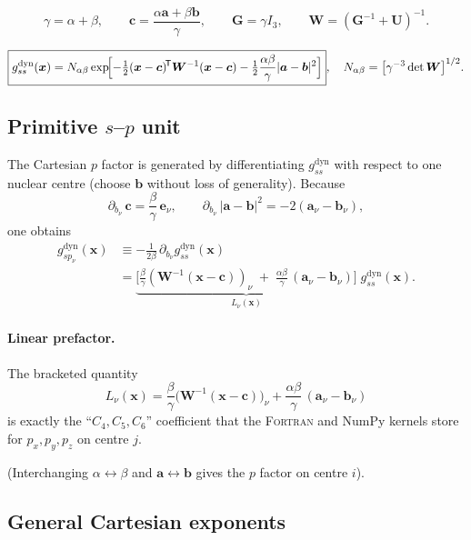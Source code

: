 \documentclass{article}
\newcommand*\expa{\alpha}
\newcommand*\expb{\beta}
\newcommand*\expab{\gamma}           %
\newcommand*\prefac{N_{\expa\expb}}  %
\newcommand*\veca{\bm a}
\newcommand*\vecb{\bm b}
\newcommand*\vecc{\bm c}
\newcommand*\matG{\bm G}             %
\newcommand*\matU{\bm U}             %
\newcommand*\matW{\bm W}             %
\newcommand*\dx[1]{\partial_{#1}}
\begin{document}
\[
  \expab=\expa+\expb,\qquad
  \vecc=\frac{\expa\veca+\expb\vecb}{\expab},\qquad
  \matG=\expab I_{3},\qquad
  \matW=(\matG^{-1}+\matU)^{-1}.
\]

\begin{equation}
  \boxed{%
    g_{ss}^{\text{dyn}}(\bm x)=
      \prefac
      \exp\!\Bigl[
        -\tfrac12(\bm x-\vecc)^{\!\mathsf T}\matW^{-1}(\bm x-\vecc)
        -\tfrac12\frac{\expa\expb}{\expab}\lvert\veca-\vecb\rvert^{2}
      \Bigr]},
  \quad
  \prefac=\bigl[\expab^{-3}\det\matW\bigr]^{1/2}.
  \label{eq:g_dyn_ss}
\end{equation}

\subsection{Primitive $s$--$p$ unit}\label{sec:sp_unit}

The Cartesian $p$ factor is generated by differentiating
$g_{ss}^{\text{dyn}}$ with respect to one nuclear centre
(choose $\vecb$ without loss of generality).  Because
\[
  \dx{b_\nu}\,\vecc =\frac{\expb}{\expab}\,\bm e_\nu,
  \qquad
  \dx{b_\nu}\,|\veca-\vecb|^{2} =-2(\veca_\nu-\vecb_\nu),
\]
one obtains
\begin{align}
  g_{sp_\nu}^{\text{dyn}}(\bm x)
  &\equiv -\frac{1}{2\expb}\,\dx{b_\nu}g_{ss}^{\text{dyn}}(\bm x) \\[4pt]
  &=\underbrace{\bigl[
      \tfrac{\expb}{\expab}( \matW^{-1}(\bm x-\vecc) )_\nu
      \;+\;\tfrac{\expa\expb}{\expab}\,(\veca_\nu-\vecb_\nu)
    \bigr]}_{\displaystyle L_\nu(\bm x)}
    \;g_{ss}^{\text{dyn}}(\bm x).
  \label{eq:g_dyn_sp}
\end{align}

\paragraph{Linear prefactor.}
The bracketed quantity
\[
  L_\nu(\bm x)=
    \frac{\expb}{\expab}\bigl(\matW^{-1}(\bm x-\vecc)\bigr)_\nu
    +\frac{\expa\expb}{\expab}\,(\veca_\nu-\vecb_\nu)
\]
is exactly the “$C_{4},C_{5},C_{6}$” coefficient that the
\textsc{Fortran} and NumPy kernels store for $p_x,p_y,p_z$ on centre $j$.

(Interchanging $\expa\leftrightarrow\expb$ and
$\veca\leftrightarrow\vecb$ gives the $p$ factor on centre $i$).

\subsection{General Cartesian exponents}\label{sec:general_cartesian}
\end{document}
